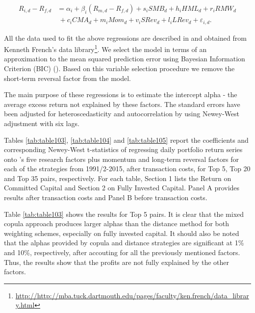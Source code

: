 \documentclass[a4paper,12pt]{report}
\begin{document}
	\begin{equation}
	\begin{aligned}
	R_{i,d}-R_{f,d}&=\alpha _{i}+\beta _{i}\left( R_{m,d}-R_{f,d}\right)+s_{i}SMB_{d}+h_{i}HML_{d}+r_{i}RMW_{d}\\
	&~+c_{i}CMA_{d}+m_{i}Mom_{d}+v_{i}SRev_{d}+l_{i}LRev_{d}+\varepsilon _{i,d}.
	\end{aligned}
	\label{eq:eq101}
	\end{equation}
	
	All the data used to fit the above regressions are described in and obtained from Kenneth French’s data library\footnote{\url{http://http://mba.tuck.dartmouth.edu/pages/faculty/ken.french/data_library.html}}. We select the model in terms of an approximation to the mean squared prediction error using Bayesian Information Criterion (BIC) (\citet*{Schwarz1978}). Based on this variable selection procedure we remove the short-term reversal factor from the model. 
	
	The main purpose of these regressions is to estimate the intercept alpha - the average excess return not explained by these factors. The standard errors have been adjusted for heteroscedasticity and autocorrelation by using Newey-West adjustment with six lags.
	
	Tables \ref{tab:table103}, \ref{tab:table104} and \ref{tab:table105} report the coefficients and corresponding Newey-West t-statistics of regressing daily portfolio return series onto \citet*{ff15}'s five research factors plus momentum and long-term reversal factors for each of the strategies from 1991/2-2015, after transaction costs, for Top 5, Top 20 and Top 35 pairs, respectively. For each table, Section 1 lists the Return on Committed Capital and Section 2 on Fully Invested Capital. Panel A provides results after transaction costs and Panel B before transaction costs.
	
	Table \ref{tab:table103} shows the results for Top 5 pairs. It is clear that the mixed copula approach produces larger alphas than the distance method for both weighting schemes, especially on fully invested capital. It should also be noted that the alphas provided by copula and distance strategies are significant at 1\% and 10\%, respectively, after accouting for all the previously mentioned factors. Thus, the results show that the profits are not fully explained by the other factors.
	
\end{document}
